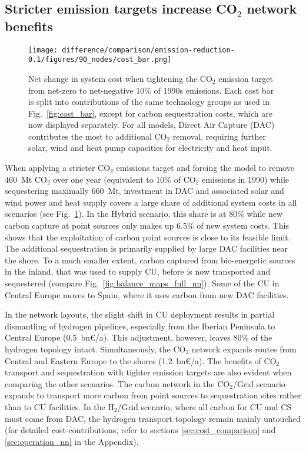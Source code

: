 \documentclass[twocolumn]{article}
\newcommand{\carbon}{CO$_2$}
\newcommand{\carbonscenario}{CO$_2$\=/Grid scenario}
\newcommand{\hydrogenscenario}{H$_2$\=/Grid scenario}
\newcommand{\hybridscenario}{Hybrid scenario}
\begin{document}
\subsection*{Stricter emission targets increase \carbon{} network benefits}
\begin{figure}[htb!]
    \centering
    \texttt{[image: difference/comparison/emission-reduction-0.1/figures/90\_nodes/cost\_bar.png]}
    \caption[short]{Net change in system cost when tightening the \carbon{} emission target from net-zero to net-negative 10\% of 1990s emissions. Each cost bar is split into contributions of the same technology groups as used in Fig.~\ref{fig:cost_bar}, except for carbon sequestration costs, which are now displayed separately. For all models, Direct Air Capture (DAC) contributes the most to additional \carbon{} removal, requiring further solar, wind and heat pump capacities for electricity and heat input.}
    \label{fig:net-negative_cost_bar}
\end{figure}


When applying a stricter \carbon{} emissions target and forcing the model to remove 460~Mt \carbon{} over one year (equivalent to 10\% of \carbon{} emissions in 1990) while sequestering maximally 660~Mt, investment in DAC and associated solar and wind power and heat supply covers a large share of additional system costs in all scenarios (see Fig.~\ref{fig:net-negative_cost_bar}). In the \hybridscenario{}, this share is at 80\% while new carbon capture at point sources only makes up 6.5\% of new system costs. This shows that the exploitation of carbon point sources is close to its feasible limit. The additional sequestration is primarily supplied by large DAC facilities near the shore. To a much smaller extent, carbon captured from bio-energetic sources in the inland, that was used to supply CU, before is now transported and sequestered (compare Fig.~\ref{fig:balance_maps_full_nn}). Some of the CU in Central Europe moves to Spain, where it uses carbon from new DAC facilities.


In the network layouts, the slight shift in CU deployment results in partial dismantling of hydrogen pipelines, especially from the Iberian Peninsula to Central Europe (0.5~bn€/a). This adjustment, however, leaves 80\% of the hydrogen topology intact. Simultaneously, the \carbon{} network expands routes from Central and Eastern Europe to the shores (1.2~bn€/a). The benefits of \carbon{} transport and sequestration with tighter emission targets are also evident when comparing the other scenarios. The carbon network in the \carbonscenario{} expands to transport more carbon from point sources to sequestration sites rather than to CU facilities. In the \hydrogenscenario{}, where all carbon for CU and CS must come from DAC, the hydrogen transport topology remain mainly untouched (for detailed cost-contributions, refer to sections \ref{sec:cost_comparison} and \ref{sec:operation_nn} in the Appendix).
\end{document}
